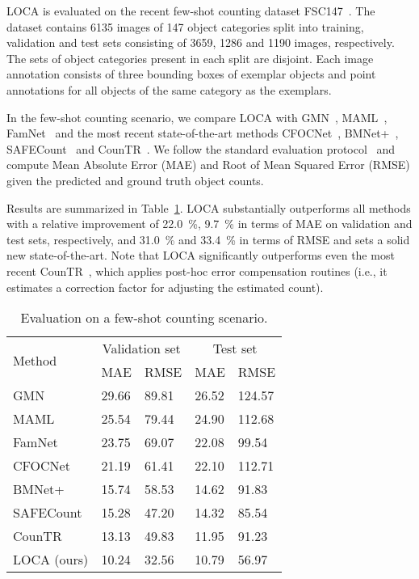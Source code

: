 \documentclass[10pt,twocolumn,letterpaper]{article}
\newcommand*\circledd[1]{\tikz[baseline=(char.base)]{
            \node[shape=circle,draw,inner sep=0.15pt] (char) {#1};}}
\newcommand{\first}[1]{{#1\raisebox{0.8pt}{\footnotesize \color{gold} \circledd{1}}}}
\newcommand{\second}[1]{{#1\raisebox{0.8pt}{\footnotesize \color{silver} \circledd{2}}}}
\newcommand{\third}[1]{{#1\raisebox{0.8pt}{\footnotesize \color{bronze} \circledd{3}}}}
\begin{document}
LOCA is evaluated on the recent few-shot counting dataset FSC147~\cite{famnet}. The dataset contains 6135 images of 147 object categories split into training, validation and test sets consisting of 3659, 1286 and 1190 images, respectively. The sets of object categories present in each split are disjoint. Each image annotation consists of three bounding boxes of exemplar objects and point annotations for all objects of the same category as the exemplars.




In the few-shot counting scenario, we compare LOCA with GMN~\cite{gmn}, MAML~\cite{maml}, FamNet~\cite{famnet} and the most recent state-of-the-art methods CFOCNet~\cite{cfocnet}, BMNet+~\cite{bmnet}, SAFECount~\cite{safecount} and CounTR~\cite{countr}.  We follow the standard evaluation protocol~\cite{famnet, bmnet, safecount} and compute Mean Absolute Error (MAE) and Root of Mean Squared Error (RMSE) given the predicted and ground truth object counts.  

Results are summarized in Table~\ref{tab:results_fs}. LOCA substantially outperforms all methods with a relative improvement of 22.0~\%, 9.7~\% in terms of MAE on validation and test sets, respectively, and 31.0~\% and 33.4~\% in terms of RMSE and sets a solid new state-of-the-art. Note that LOCA significantly outperforms even the most recent CounTR~\cite{countr}, which applies post-hoc error compensation routines (i.e., it estimates a correction factor for adjusting the estimated count).

\begin{table}[htbp]
    \centering
    \begin{tabular}{l l l l l}\toprule
        \multirow{2}{*}{Method}& \multicolumn{2}{c}{Validation set} & \multicolumn{2}{c}{Test set} \\
        & MAE & RMSE & MAE & RMSE \\ 
        \midrule
        GMN~\cite{gmnclass} & 29.66 & 89.81 & 26.52 & 124.57 \\
        MAML~\cite{maml} & 25.54 & 79.44 & 24.90 & 112.68 \\
        FamNet~\cite{famnet} & 23.75 & 69.07 & 22.08 & 99.54 \\
        CFOCNet~\cite{cfocnet} & 21.19 & 61.41 & 22.10 & 112.71 \\        
        BMNet+~\cite{bmnet} & 15.74 & 58.53 & 14.62 & 91.83 \\
        SAFECount~\cite{safecount} & \third{15.28} & \second{47.20} & \third{14.32} & \second{85.54} \\
        CounTR~\cite{countr} & \second{13.13} & \third{49.83} & \second{11.95} & \third{91.23} \\
        LOCA (ours) & \first{10.24} & \first{32.56} & \first{10.79} & \first{56.97} \\
        \bottomrule
    \end{tabular}
    \caption{Evaluation on a few-shot counting scenario.}
    \label{tab:results_fs}
\end{table}
\end{document}
